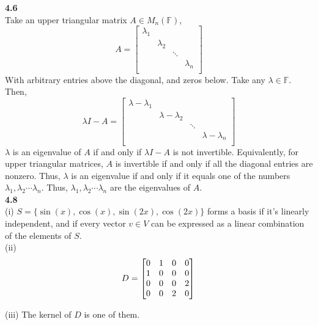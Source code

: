 \documentclass[letterpaper,12pt]{article}
\theoremstyle{definition}
\begin{document}
\noindent\textbf{4.6}\\
Take an upper triangular matrix $A \in M_n(\mathbb{F})$,
\begin{equation*}
A= \begin{bmatrix}
	\lambda_1 & & & \\
	& \lambda_2 & & \\
	& & \ddots & \\
	& & & \lambda_n\\
\end{bmatrix}
\end{equation*}
With arbitrary entries above the diagonal, and zeros below. Take any $\lambda \in \mathbb{F}$. Then,
\begin{equation*}
\lambda I - A = \begin{bmatrix}
	\lambda - \lambda_1 & & & \\
	& \lambda - \lambda_2 & & \\
	& & \ddots & \\
	& & & \lambda - \lambda_n\\
\end{bmatrix}
\end{equation*}
$\lambda$ is an eigenvalue of $A$ if and only if $\lambda I - A$ is not invertible. Equivalently, for upper triangular matrices, $A$ is invertible if and only if all the diagonal entries are nonzero. Thus, $\lambda$ is an eigenvalue if and only if it equals one of the numbers $\lambda_1, \lambda_2 \cdots \lambda_n$. Thus, $\lambda_1, \lambda_2 \cdots \lambda_n$ are the eigenvalues of $A$.\\

\noindent\textbf{4.8}\\
(i) $S = \{\sin(x), \cos(x), \sin(2x), \cos(2x)\}$ forms a basis if it's linearly independent, and if every vector $v \in V$ can be expressed as a linear combination of the elements of $S$. \\

\noindent(ii) \begin{equation*}
D = \begin{bmatrix}
	0 & 1 & 0 & 0\\
	1 & 0 & 0 & 0\\
	0 & 0 & 0 & 2\\
	0 & 0 & 2 & 0
\end{bmatrix}\\
\end{equation*}

\noindent(iii) The kernel of $D$ is one of them. \\
\end{document}
